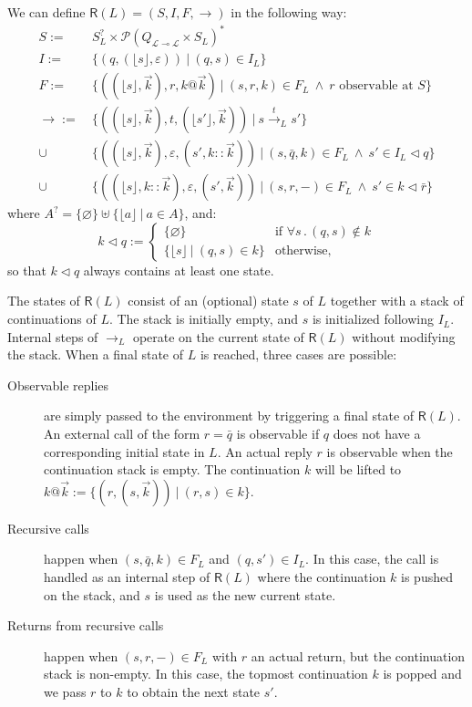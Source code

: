 \documentclass[11pt]{article}
\newcommand{\kw}[1]{{\mathsf{#1}}}
\begin{document}
We can define $\kw{R}(L) = (S, I, F, {\rightarrow})$ in the following way:
\begin{align*}
  S := &\: S_L^? \times \mathcal{P}(Q_{\mathcal{L} \multimap \mathcal{L}} \times S_L)^* \\
  I := &\: \{ (q, (\lfloor s \rfloor, \varepsilon)) \: \vert \: (q, s) \in I_L \} \\
  F := &\: \{ ((\lfloor s \rfloor, \vec{k}), r, k@\vec{k}) \: \vert \:
           (s, r, k) \in F_L \: \wedge \: r \mbox{ observable at } S \} \\
  {\rightarrow} :=
    &\: \{ ((\lfloor s \rfloor, \vec{k}), t, (\lfloor s' \rfloor, \vec{k})) \: \vert \:
        s \stackrel{t}{\longrightarrow}_L s' \} \\
    \cup &\: \{ ((\lfloor s \rfloor, \vec{k}), \varepsilon, (s', k::\vec{k})) \: \vert \:
        (s, \bar{q}, k) \in F_L \: \wedge \:
        s' \in I_L \lhd q \} \\
    \cup &\: \{ ((\lfloor s \rfloor, k::\vec{k}), \varepsilon, (s', \vec{k})) \: \vert \:
        (s, r, -) \in F_L \: \wedge \:
        s' \in k \lhd \bar{r} \}
\end{align*}
where $A^? = \{ \varnothing \} \uplus \{ \lfloor a \rfloor \:|\: a \in A \}$, and:
\[
  k \lhd q :=
  \begin{cases}
    \{ \varnothing \} &\mbox{if } \forall s \,.\, (q, s) \notin k \\
    \{ \lfloor s \rfloor \: | \: (q, s) \in k \} &\mbox{otherwise,}
  \end{cases}
\]
so that $k \lhd q$ always contains at least one state.

The states of $\kw{R}(L)$
consist of an (optional) state $s$ of $L$ together with a stack of continuations of $L$.
The stack is initially empty,
and $s$ is initialized following $I_L$.
Internal steps of $\rightarrow_L$ operate on the current state of $\kw{R}(L)$
without modifying the stack.
When a final state of $L$ is reached, three cases are possible:
\begin{description}
\item[Observable replies] are simply passed to the environment
  by triggering a final state of $\kw{R}(L)$.
  An external call of the form $r = \bar{q}$ is observable
  if $q$ does not have a corresponding initial state in $L$.
  An actual reply $r$ is observable when the continuation stack is empty.
  The continuation $k$ will be lifted to
  $k@\vec{k} := \{ (r, (s, \vec{k})) \: \vert \: (r, s) \in k \}$.
\item[Recursive calls] happen when
  $(s, \bar{q}, k) \in F_L$ and $(q, s') \in I_L$.
  In this case, the call is handled as an internal step of $\kw{R}(L)$
  where the continuation $k$ is pushed on the stack,
  and $s$ is used as the new current state.
\item[Returns from recursive calls] happen when $(s, r, -) \in F_L$
  with $r$ an actual return, but the continuation stack is non-empty.
  In this case, the topmost continuation $k$ is popped
  and we pass $r$ to $k$ to obtain the next state $s'$.
\end{description}
\end{document}
